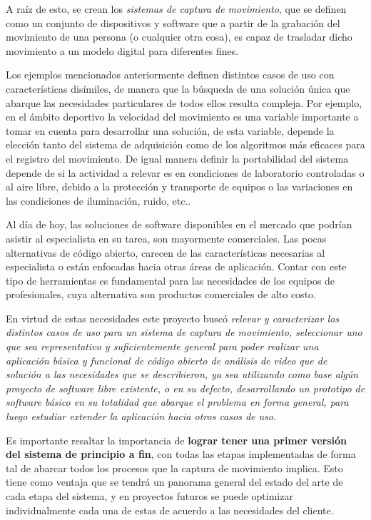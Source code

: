 A raíz de esto, se crean los \emph{sistemas de captura de movimiento}, que se definen como un conjunto de dispositivos y software que a partir de la grabación del movimiento de una persona (o cualquier otra cosa), es capaz de trasladar dicho movimiento a un modelo digital para diferentes fines.

Los ejemplos mencionados anteriormente definen distintos casos de uso con características disímiles, de manera que la búsqueda de una solución única que abarque las necesidades particulares de todos ellos resulta compleja. Por ejemplo, en el ámbito deportivo la velocidad del movimiento es una variable importante a tomar en cuenta para desarrollar una solución, de esta variable, depende la elección tanto del sistema de adquisición como de los algoritmos más eficaces para el registro del movimiento.  De igual manera definir la portabilidad del sistema depende de si la actividad a relevar es en condiciones de laboratorio controladas o al aire libre, debido a la protección y transporte de equipos o las variaciones en las condiciones de iluminación, ruido, etc..

Al  día  de  hoy,  las  soluciones  de  software  disponibles  en  el  mercado que  podrían  asistir al especialista en su tarea, son mayormente comerciales. Las pocas alternativas de código abierto, carecen de las características necesarias al especialista o están enfocadas hacia otras áreas de aplicación. Contar con este tipo de herramientas es fundamental para las necesidades de los equipos de profesionales, cuya alternativa son productos comerciales de alto costo.

En virtud de estas necesidades este proyecto buscó \emph{relevar y caracterizar los distintos casos de uso para un sistema de captura de movimiento,  seleccionar uno que sea representativo y suficientemente general para poder realizar una aplicación básica y funcional de código abierto de análisis de video que de solución a las necesidades que se describieron, ya sea utilizando como base algún  proyecto  de  software  libre  existente,  o en su defecto, desarrollando un prototipo de software básico en su totalidad que abarque el problema en forma general, para luego estudiar extender la aplicación hacia otros casos de uso}.

Es importante resaltar la importancia de \textbf{lograr tener una primer versión del sistema de principio a fin}, con todas las etapas implementadas de forma tal de abarcar todos los procesos que la captura de movimiento implica.  Esto tiene como ventaja que se tendrá un panorama general del estado del arte de cada etapa del sistema, y en proyectos futuros se puede optimizar individualmente cada una de estas de acuerdo a las necesidades del cliente.

